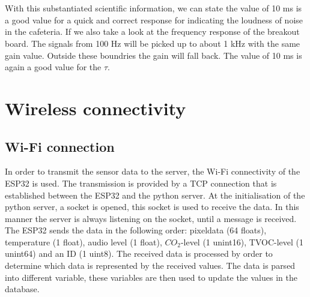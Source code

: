 \documentclass[11pt,a4paper]{article}
\begin{document}
\\ \\ With this substantiated scientific information, we can state the value of 10 ms is a good value for a quick and correct response for indicating the loudness of noise in the cafeteria. If we also take a look at the frequency response of the breakout board. The signals from 100 Hz will be picked up to about 1 kHz with the same gain value. Outside these boundries the gain will fall back. The value of 10 ms is again a good value for the $\tau$.




\section{Wireless connectivity}
\subsection{Wi-Fi connection} \label{wifiCon}
In order to transmit the sensor data to the server, the Wi-Fi connectivity of the ESP32 is used. The transmission is provided by a TCP connection that is established between the ESP32 and the python server. At the initialisation of the python server, a socket is opened, this socket is used to receive the data. In this manner the server is always listening on the socket, until a message is received. The ESP32 sends the data in the following order: pixeldata (64 floats), temperature (1 float), audio level (1 float), $CO_2$-level (1 unint16), TVOC-level (1 unint64) and an ID (1 uint8). The received data is processed by order to determine which data is represented by the received values. The data is parsed into different variable, these variables are then used to update the values in the database. 
\end{document}
